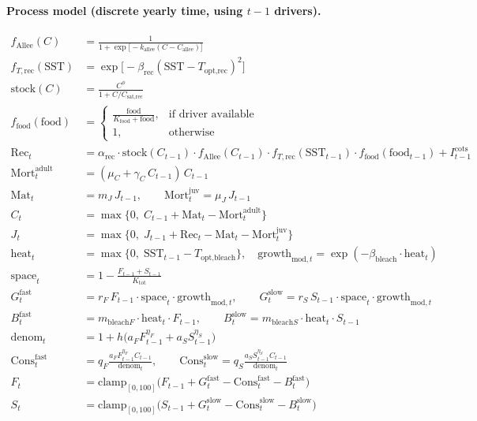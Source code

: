 \paragraph{Process model (discrete yearly time, using \(t-1\) drivers).}
\begin{align}
f_{\text{Allee}}(C) &= \frac{1}{1 + \exp\!\big[-k_{\text{allee}}(C - C_{\text{allee}})\big]} \\
f_{T,\text{rec}}(\mathrm{SST}) &= \exp\!\big[-\beta_{\text{rec}}(\mathrm{SST} - T_{\text{opt,rec}})^2\big] \\
\text{stock}(C) &= \frac{C^{\phi}}{1 + C/C_{\text{sat,rec}}} \\
f_{\text{food}}(\mathrm{food}) &= 
\begin{cases}
\displaystyle \frac{\mathrm{food}}{K_{\text{food}} + \mathrm{food}}, & \text{if driver available}\\[6pt]
1, & \text{otherwise}
\end{cases} \\[4pt]
\mathrm{Rec}_t &= \alpha_{\text{rec}}\cdot \text{stock}(C_{t-1}) \cdot f_{\text{Allee}}(C_{t-1})\cdot f_{T,\text{rec}}(\mathrm{SST}_{t-1})\cdot f_{\text{food}}(\mathrm{food}_{t-1}) + I^{\text{cots}}_{t-1} \\[4pt]
\mathrm{Mort}^{\text{adult}}_{t} &= (\mu_C + \gamma_C\, C_{t-1})\, C_{t-1} \\
\mathrm{Mat}_t &= m_J\, J_{t-1}, \qquad \mathrm{Mort}^{\text{juv}}_t = \mu_J\, J_{t-1} \\[4pt]
C_t &= \max\!\big\{0,\; C_{t-1} + \mathrm{Mat}_t - \mathrm{Mort}^{\text{adult}}_{t}\big\} \\
J_t &= \max\!\big\{0,\; J_{t-1} + \mathrm{Rec}_t - \mathrm{Mat}_t - \mathrm{Mort}^{\text{juv}}_{t}\big\} \\[4pt]
\text{heat}_t &= \max\!\big\{0,\; \mathrm{SST}_{t-1} - T_{\text{opt,bleach}}\big\}, \quad
\text{growth}_{\text{mod},t} = \exp(-\beta_{\text{bleach}}\cdot \text{heat}_t) \\[4pt]
\text{space}_t &= 1 - \frac{F_{t-1}+S_{t-1}}{K_{\text{tot}}} \\[4pt]
G^{\text{fast}}_t &= r_F\, F_{t-1}\cdot \text{space}_t \cdot \text{growth}_{\text{mod},t}, \qquad
G^{\text{slow}}_t = r_S\, S_{t-1}\cdot \text{space}_t \cdot \text{growth}_{\text{mod},t} \\[4pt]
B^{\text{fast}}_t &= m_{\text{bleach}F}\cdot \text{heat}_t \cdot F_{t-1}, \qquad
B^{\text{slow}}_t = m_{\text{bleach}S}\cdot \text{heat}_t \cdot S_{t-1} \\[4pt]
\text{denom}_t &= 1 + h\big(a_F F_{t-1}^{\eta_F} + a_S S_{t-1}^{\eta_S}\big) \\
\mathrm{Cons}^{\text{fast}}_t &= q_F \frac{a_F F_{t-1}^{\eta_F} C_{t-1}}{\text{denom}_t}, \qquad
\mathrm{Cons}^{\text{slow}}_t = q_S \frac{a_S S_{t-1}^{\eta_S} C_{t-1}}{\text{denom}_t} \\[4pt]
F_t &= \mathrm{clamp}_{[0,100]}\!\big(F_{t-1} + G^{\text{fast}}_t - \mathrm{Cons}^{\text{fast}}_t - B^{\text{fast}}_t\big) \\
S_t &= \mathrm{clamp}_{[0,100]}\!\big(S_{t-1} + G^{\text{slow}}_t - \mathrm{Cons}^{\text{slow}}_t - B^{\text{slow}}_t\big)
\end{align}


